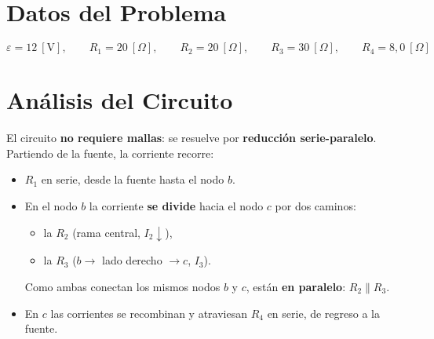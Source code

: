 \documentclass[12pt,letterpaper]{article}
\begin{document}
\begin{center}
\end{center}

\section*{Datos del Problema}

\[
    \varepsilon = 12\ [\text{V}],\qquad
    R_1 = 20\ [\Omega],\qquad
    R_2 = 20\ [\Omega],\qquad
    R_3 = 30\ [\Omega],\qquad
    R_4 = 8{,}0\ [\Omega]
\]

\section*{An\'alisis del Circuito}

El circuito \textbf{no requiere mallas}: se resuelve por \textbf{reducci\'on serie-paralelo}.
Partiendo de la fuente, la corriente recorre:

\begin{itemize}
    \item \textbf{\textcolor{colR1}{$R_1$}} en serie, desde la fuente hasta el nodo $b$.
    \item En el nodo $b$ la corriente \textbf{se divide} hacia el nodo $c$ por dos caminos:
          \begin{itemize}
              \item la \textbf{\textcolor{colR2}{$R_2$}} (rama central, $I_2 \downarrow$),
              \item la \textbf{\textcolor{colR3}{$R_3$}} ($b \to$ lado derecho $\to c$, $I_3$).
          \end{itemize}
          Como ambas conectan los mismos nodos $b$ y $c$, est\'an \textbf{en paralelo}:
          $R_2 \parallel R_3$.
    \item En $c$ las corrientes se recombinan y atraviesan \textbf{\textcolor{colR4}{$R_4$}}
          en serie, de regreso a la fuente.
\end{itemize}
\end{document}
